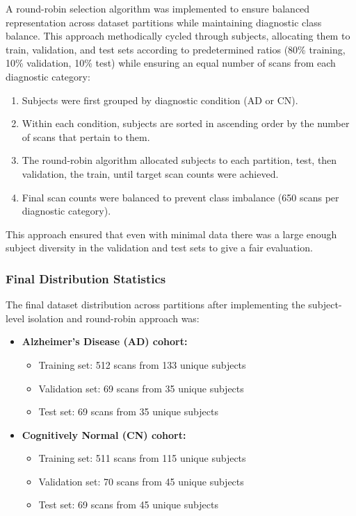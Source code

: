 \documentclass[12pt, a4paper]{article}
\begin{document}
A round-robin selection algorithm was implemented to ensure balanced representation across dataset partitions while maintaining diagnostic class balance. This approach methodically cycled through subjects, allocating them to train, validation, and test sets according to predetermined ratios (80\% training, 10\% validation, 10\% test) while ensuring an equal number of scans from each diagnostic category:
\begin{enumerate}
    \item Subjects were first grouped by diagnostic condition (AD or CN).
    \item Within each condition, subjects are sorted in ascending order by the number of scans that pertain to them.
    \item The round-robin algorithm allocated subjects to each partition, test, then validation, the train, until target scan counts were achieved.
    \item Final scan counts were balanced to prevent class imbalance (650 scans per diagnostic category).
\end{enumerate}

This approach ensured that even with minimal data there was a large enough subject diversity in the validation and test sets to give a fair evaluation.

\subsubsection{Final Distribution Statistics}

The final dataset distribution across partitions after implementing the subject-level isolation and round-robin approach was:

\begin{itemize}
    \item \textbf{Alzheimer's Disease (AD) cohort:}
    \begin{itemize}
        \item Training set: 512 scans from 133 unique subjects
        \item Validation set: 69 scans from 35 unique subjects
        \item Test set: 69 scans from 35 unique subjects
    \end{itemize}
    \item \textbf{Cognitively Normal (CN) cohort:}
    \begin{itemize}
        \item Training set: 511 scans from 115 unique subjects
        \item Validation set: 70 scans from 45 unique subjects
        \item Test set: 69 scans from 45 unique subjects
    \end{itemize}
\end{itemize}
\end{document}
